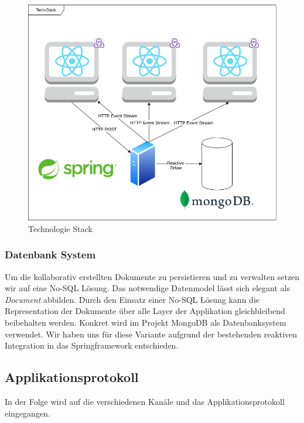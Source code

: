 \begin{figure}[h]
    \centering
    \begin{minipage}[b]{\textwidth}
        \includegraphics[width=\textwidth]{images/TechStack2.drawio}
        \caption{Technologie Stack}
    \end{minipage}\label{fig:figstack}
\end{figure}

\subsubsection{Datenbank System}
Um die kollaborativ erstellten Dokumente zu persistieren und zu verwalten setzen wir auf eine No-SQL Lösung.
Das notwendige Datenmodel lässt sich elegant als \emph{Document} abbilden.
Durch den Einsatz einer No-SQL Lösung kann die Representation der Dokumente über alle Layer der Applikation gleichbleibend beibehalten werden\@.
Konkret wird im Projekt MongoDB als Datenbanksystem verwendet.
Wir haben uns für diese Variante aufgrund der bestehenden reaktiven Integration in das Springframework entschieden.

\clearpage

\subsection{Applikationsprotokoll}
In der Folge wird auf die verschiedenen Kanäle und das Applikationsprotokoll eingegangen.

